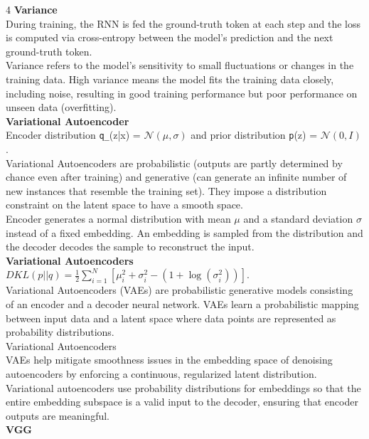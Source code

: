 \documentclass[8pt]{extarticle}
\begin{document}
\begin{multicols}{4}
\vspace{2pt}\textbf{Variance}\\
During training, the RNN is fed the ground-truth token at each step and the loss is computed via cross-entropy between the model's prediction and the next ground-truth token.\\
Variance refers to the model's sensitivity to small fluctuations or changes in the training data. High variance means the model fits the training data closely, including noise, resulting in good training performance but poor performance on unseen data (overfitting).\\
\vspace{2pt}\textbf{Variational Autoencoder}\\
Encoder distribution \texttt{q\_{\phi}}(z|x) = $\mathcal{N}(\mu, \sigma)$ and prior distribution \texttt{p}(z) = $\mathcal{N}(0, I)$.\\
Variational Autoencoders are probabilistic (outputs are partly determined by chance even after training) and generative (can generate an infinite number of new instances that resemble the training set). They impose a distribution constraint on the latent space to have a smooth space.\\
Encoder generates a normal distribution with mean $\mu$ and a standard deviation $\sigma$ instead of a fixed embedding. An embedding is sampled from the distribution and the decoder decodes the sample to reconstruct the input.\\
\vspace{2pt}\textbf{Variational Autoencoders}\\
$DKL(p||q) = \frac{1}{2} \sum_{i=1}^{N} [\mu_i^{2} + \sigma_i^{2} - (1 + \log(\sigma_i^{2}))]$.\\
Variational Autoencoders (VAEs) are probabilistic generative models consisting of an encoder and a decoder neural network. VAEs learn a probabilistic mapping between input data and a latent space where data points are represented as probability distributions.\\
Variational Autoencoders\\
VAEs help mitigate smoothness issues in the embedding space of denoising autoencoders by enforcing a continuous, regularized latent distribution.\\
Variational autoencoders use probability distributions for embeddings so that the entire embedding subspace is a valid input to the decoder, ensuring that encoder outputs are meaningful.\\
\vspace{2pt}\textbf{VGG}\\

\end{multicols}
\end{document}
